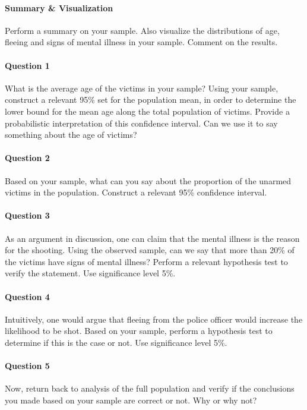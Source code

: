 \documentclass[a4paper, 10pt,serif]{article}
\begin{document}
\paragraph{Summary \& Visualization} Perform a summary on your sample. Also visualize the distributions of age, fleeing and signs of mental illness in your sample. Comment on the results.

\paragraph{Question 1} What is the average age of the victims in your sample? Using your sample, construct a relevant 95\% set for the population mean, in order to determine the lower bound for the mean age along the total population of victims. Provide a probabilistic interpretation of this confidence interval. Can we use it to say something about the age of victims?

\paragraph{Question 2} Based on your sample, what can you say about the proportion of the unarmed victims in the population. Construct a relevant 95\% confidence interval. 

\paragraph{Question 3} As an argument in discussion, one can claim that the mental illness is the reason for the shooting. Using the observed sample, can we say that more than 20\% of the victims have signs of mental illness? Perform a relevant hypothesis test to verify the statement. Use significance level 5\%. 

\paragraph{Question 4} Intuitively, one would argue that fleeing from the police officer would increase the likelihood to be shot. Based on your sample, perform a hypothesis test to determine if this is the case or not. Use significance level 5\%.  

\paragraph{Question 5} Now, return back to analysis of the full population and verify if the conclusions you made based on your sample are correct or not. Why or why not? 
\end{document}
